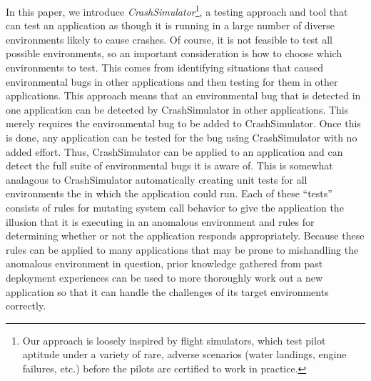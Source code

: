 %

In this paper, we introduce {\em CrashSimulator}\footnote{
Our approach is loosely inspired by flight simulators, which test pilot
aptitude under a variety of rare, adverse scenarios (water landings, 
engine failures, etc.) before the pilots are certified to work in practice.}, 
a testing approach
and tool that can test an application as though it is running in a large number
of diverse environments likely to cause crashes.  Of course, it is not 
feasible to test all possible environments, so an important consideration
is how to choose which environments to test.  This comes from identifying 
situations that caused environmental bugs in other applications and then
testing for them in other applications.
This approach means that an environmental bug that is detected in one application can be 
detected by CrashSimulator in other applications.  This merely requires the 
environmental bug to be added to CrashSimulator. Once this is done, any application can
be tested for the bug using CrashSimulator with no added effort.  Thus,
CrashSimulator can be applied to an application and can detect the full 
suite of environmental bugs it is aware of.  This is somewhat analagous to
CrashSimulator automatically creating unit tests for all environments the 
in which the application could run.
Each of these ``tests'' consists of rules for
mutating system call behavior to give the application the illusion that it is
executing in an anomalous environment and rules for determining whether or not
the application responds appropriately.
Because these rules can be applied to many
applications that may be prone to mishandling the
anomalous environment in question, prior knowledge
gathered from past deployment experiences can be used to more thoroughly work
out a new application so that it can
handle the challenges of its target environments correctly.



